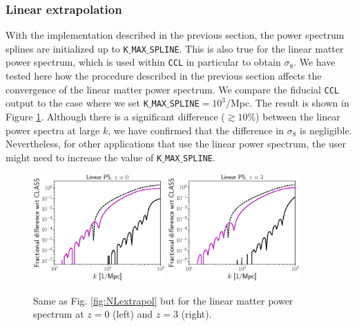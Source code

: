 \documentclass[\docopts]{\docclass}
\begin{document}
\subsubsection{Linear extrapolation}
\label{sec:Lextrapol}

With the implementation described in the previous section, the power spectrum splines are initialized up to {\tt K$\_$MAX$\_$SPLINE}. This is also true for the linear matter power spectrum, which is used within {\tt CCL} in particular to obtain $\sigma_8$. We have tested here how the procedure described in the previous section affects the convergence of the linear matter power spectrum. We compare the fiducial {\tt CCL} output to the case where we set {\tt K$\_$MAX$\_$SPLINE}$=10^3/$Mpc. The result is shown in Figure \ref{fig:Lextrapol}. Although there is a significant difference ($\gtrsim 10\%$) between the linear power spectra at large $k$, we have confirmed that the difference in $\sigma_8$ is negligible. Nevertheless, for other applications that use the linear power spectrum, the user might need to increase the value of {\tt K$\_$MAX$\_$SPLINE}.

\begin{figure}
\centering
\includegraphics[width=0.45\textwidth]{PS_converge_linear.eps}
\includegraphics[width=0.45\textwidth]{PS_converge_linear_z3.eps}
\caption{Same as Fig. \ref{fig:NLextrapol} but for the linear matter power spectrum at $z=0$ (left) and $z=3$ (right).}
\label{fig:Lextrapol}
\end{figure}
\end{document}
